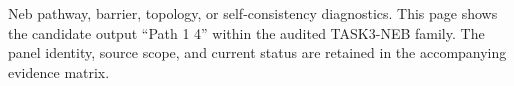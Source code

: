 Neb pathway, barrier, topology, or self-consistency diagnostics. This page shows the candidate output ``Path 1 4'' within the audited TASK3-NEB family. The panel identity, source scope, and current status are retained in the accompanying evidence matrix.
